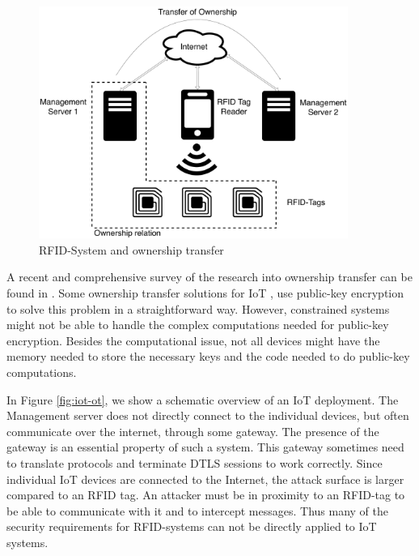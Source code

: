 \begin{figure}[h]
\centering
\includegraphics[width=0.9\textwidth]{images/RFID-Tag_OT.pdf}
\caption{RFID-System and ownership transfer}
\label{fig:rfid-ot}
\end{figure}



A recent and comprehensive survey of the research into ownership transfer can be found in \cite{taqieddin2018tag}.
Some ownership transfer solutions for IoT \cite{tam2004protocol}, use public-key encryption to solve this problem in a straightforward way. However, constrained systems might not be able to handle the complex computations needed for public-key encryption. Besides the computational issue, not all devices might have the memory needed to store the necessary keys and the code needed to do public-key computations.

In Figure \ref{fig:iot-ot}, we show a schematic overview of an IoT deployment. The Management server does not directly connect to the individual devices, but often communicate over the internet, through some gateway. The presence of the gateway is an essential property of such a system. This gateway sometimes need to translate protocols and terminate DTLS sessions to work correctly. Since individual IoT devices are connected to the Internet, the attack surface is larger compared to an RFID tag. An attacker must be in proximity to an RFID-tag to be able to communicate with it and to intercept messages. Thus many of the security requirements for RFID-systems can not be directly applied to IoT systems.



